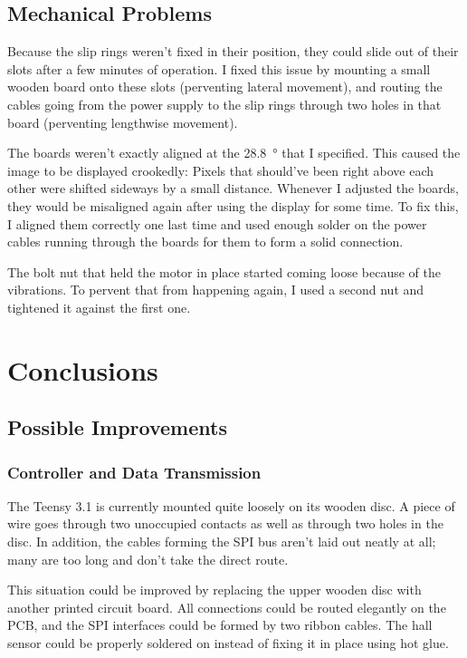 \documentclass[a4paper, 11pt, titlepage]{report}
\begin{document}
\section{Mechanical Problems}

Because the slip rings weren't fixed in their position, they could slide out of their slots after
a few minutes of operation. I fixed this issue by mounting a small wooden board onto these slots
(perventing lateral movement), and routing the cables going from the power supply to the slip rings
through two holes in that board (perventing lengthwise movement).

The boards weren't exactly aligned at the \SI{28.8}{\degree} that I specified. This caused the
image to be displayed crookedly: Pixels that should've been right above each other were shifted
sideways by a small distance. Whenever I adjusted the boards, they would be misaligned again after
using the display for some time. To fix this, I aligned them correctly one last time and used
enough solder on the power cables running through the boards for them to form a solid connection.

The bolt nut that held the motor in place started coming loose because of the vibrations. To
pervent that from happening again, I used a second nut and tightened it against the first one.


\chapter{Conclusions}

\section{Possible Improvements}

\subsection{Controller and Data Transmission}

The Teensy 3.1 is currently mounted quite loosely on its wooden disc. A piece of wire goes through
two unoccupied contacts as well as through two holes in the disc. In addition, the cables forming
the SPI bus aren't laid out neatly at all; many are too long and don't take the direct route.

This situation could be improved by replacing the upper wooden disc with another printed circuit
board. All connections could be routed elegantly on the PCB, and the SPI interfaces could be
formed by two ribbon cables. The hall sensor could be properly soldered on instead of fixing it in
place using hot glue.
\end{document}
